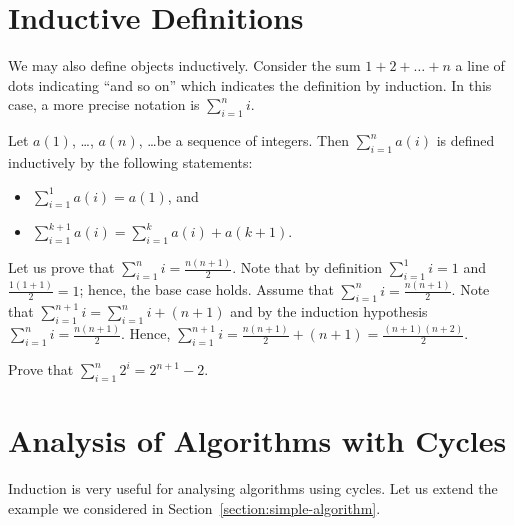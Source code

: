 \section{Inductive Definitions}

We may also define objects inductively. Consider the sum
$1 + 2 + \dots + n$ a line of dots indicating ``and so on'' which indicates the
definition by induction. In this case, a more precise notation is
$\sum_{i = 1}^n i$.

\begin{definition}
    Let $a(1)$, \dots, $a(n)$, \dots be a sequence of integers. Then
    $\sum_{i = 1}^n a(i)$ is defined inductively by the following
    statements:
    \begin{itemize}
        \item $\sum_{i = 1}^1 a(i) = a(1)$, and
        \item $\sum_{i = 1}^{k + 1} a(i) =
            \sum_{i = 1}^k a(i) + a(k + 1)$.
    \end{itemize}
\end{definition}

Let us prove that $\sum_{i = 1}^n i = \frac{n (n + 1)}{2}$.
Note that by definition $\sum_{i = 1}^1 i = 1$ and
$\frac{1 (1 + 1)}{2} = 1$; hence, the base case holds. Assume that
$\sum_{i = 1}^n i = \frac{n (n + 1)}{2}$. Note that
$\sum_{i = 1}^{n + 1} i = \sum_{i = 1}^n i + (n + 1)$ and by the
induction hypothesis $\sum_{i = 1}^n i = \frac{n (n + 1)}{2}$.
Hence, $\sum_{i = 1}^{n + 1} i = \frac{n (n + 1)}{2} + (n + 1) =
\frac{(n + 1)(n + 2)}{2}$.

\begin{exercise}
    Prove that $\sum_{i = 1}^n 2^i = 2^{n + 1} - 2$.
\end{exercise}

\section{Analysis of Algorithms with Cycles}

Induction is very useful for analysing algorithms using cycles. Let us extend
the example we considered in Section~\ref{section:simple-algorithm}.

